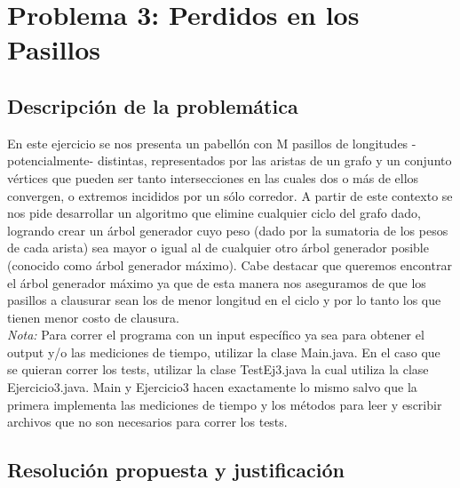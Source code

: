\section{Problema 3: Perdidos en los Pasillos}

\subsection{Descripción de la problemática}

En este ejercicio se nos presenta un pabellón con M pasillos de longitudes -potencialmente- distintas, representados por las aristas de un grafo y un conjunto vértices que pueden ser tanto intersecciones en las cuales dos o más de ellos convergen, o extremos incididos por un sólo corredor. 
A partir de este contexto se nos pide desarrollar un algoritmo que elimine cualquier ciclo del grafo dado, logrando crear un árbol generador cuyo peso (dado por la sumatoria de los pesos de cada arista) sea mayor o igual al de cualquier otro árbol generador posible (conocido como árbol generador máximo). Cabe destacar que queremos encontrar el árbol generador máximo ya que de esta manera nos aseguramos de que los pasillos a clausurar sean los de menor longitud en el ciclo y por lo tanto los que tienen menor costo de clausura.\\

\emph{Nota:} Para correr el programa con un input específico ya sea para obtener el output y/o las mediciones de tiempo, utilizar la clase Main.java. En el caso que se quieran correr los tests, utilizar la clase TestEj3.java la cual utiliza la clase Ejercicio3.java. Main y Ejercicio3 hacen exactamente lo mismo salvo que la primera implementa las mediciones de tiempo y los métodos para leer y escribir archivos que no son necesarios para correr los tests. 

\subsection{Resolución propuesta y justificación}

